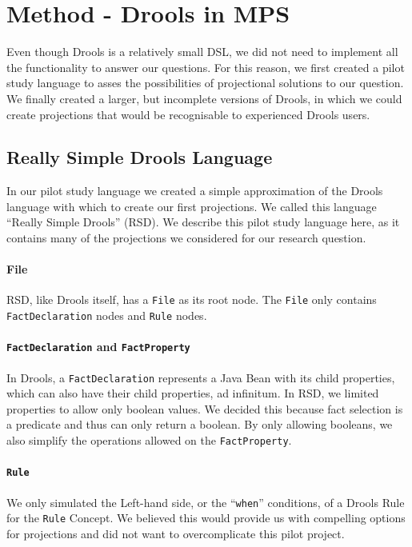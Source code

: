 \section{Method - Drools in MPS}
\label{section:dsr_method}

Even though Drools is a relatively small DSL, we did not need to implement all the functionality to answer our questions.
For this reason, we first created a pilot study language to asses the possibilities of projectional solutions to our question.
We finally created a larger, but incomplete versions of Drools, in which we could create projections that would be recognisable to experienced Drools users.

\subsection{Really Simple Drools Language}
In our pilot study language we created a simple approximation of the Drools language with which to create our first projections.
We called this language ``Really Simple Drools'' (RSD).
We describe this pilot study language here, as it contains many of the projections we considered for our research question.

\paragraph{File} RSD, like Drools itself, has a \texttt{File} as its root node.
The \texttt{File} only contains \texttt{FactDeclaration} nodes and \texttt{Rule} nodes.

\paragraph{\texttt{FactDeclaration} and \texttt{FactProperty}} In Drools, a \texttt{FactDeclaration} represents a Java Bean with its child properties, which can also have their child properties, ad infinitum.
In RSD, we limited properties to allow only boolean values.
We decided this because fact selection is a predicate and thus can only return a boolean.
By only allowing booleans, we also simplify the operations allowed on the \texttt{FactProperty}.

\paragraph{\texttt{Rule}} We only simulated the Left-hand side, or the ``\texttt{when}'' conditions, of a Drools Rule for the \texttt{Rule} Concept.
We believed this would provide us with compelling options for projections and did not want to overcomplicate this pilot project.

